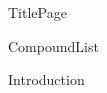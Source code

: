 \documentclass[10pt,a4paper]{article}
\begin{document}
{TitlePage}

{CompoundList}

\tableofcontents

%
%
{Introduction}
%
%
%


\newpage
{}


\end{document}
